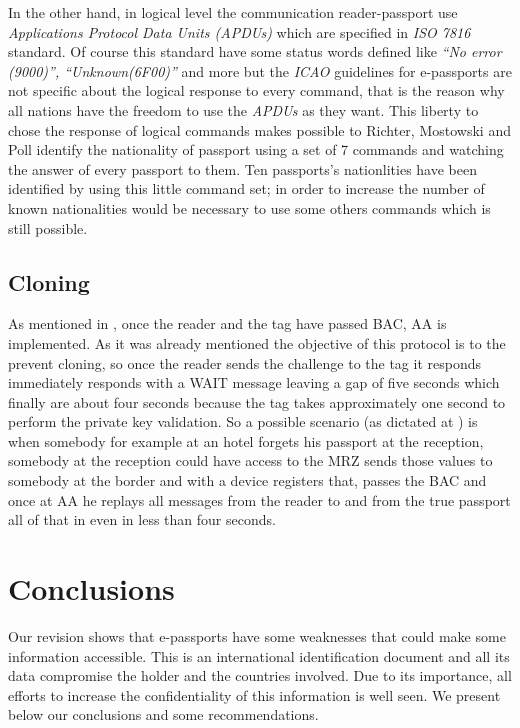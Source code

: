 \documentclass{acm_proc_article-sp}
\begin{document}
In the other hand, in logical level the communication reader-passport use \textit{Applications Protocol 
Data Units (APDUs)} which are specified in \textit{ISO 7816} standard. Of course this standard have some status 
words defined like \textit{“No error (9000)”, “Unknown(6F00)”} and more but the \textit{ICAO} guidelines for 
e-passports are not specific about the logical response to every command, that is the reason why 
all nations have the freedom to use the \textit{APDUs} as they want. This liberty to chose the response of 
logical commands makes possible to Richter, Mostowski and Poll \cite{03HENN} identify the nationality of 
passport using a set of 7 commands and watching the answer of every passport to them. Ten passports's 
nationlities have been identified by using this little command set; in order to increase the number of 
known nationalities would be necessary to use some others commands which is still possible.


\subsection{Cloning}
As mentioned in \cite{MHTR07}, once the reader and the tag have passed BAC, AA is implemented. 
As it was already mentioned the objective of this protocol is to the prevent cloning, 
so once the reader sends the challenge to the tag it responds immediately responds with a 
WAIT message leaving a gap of five seconds which finally are about four seconds because the 
tag takes approximately one second to perform the private key validation. 
So a possible scenario (as dictated at \cite{MHTR07}) is when somebody for 
example at an hotel forgets his passport at the reception, somebody at the reception 
could have access to the MRZ sends those values to somebody at the border and with a 
device registers that, passes the BAC and once at AA he replays all messages from the 
reader to and from the true passport all of that in even in less than four seconds.

\section{Conclusions}
\label{sec:sec4}
Our revision shows that e-passports have some weaknesses that could make some information accessible. This is an international identification document and all its data compromise the holder and the countries involved. Due to its importance, all efforts to increase the confidentiality of this information is well seen. We present below our conclusions and some recommendations.
\end{document}
